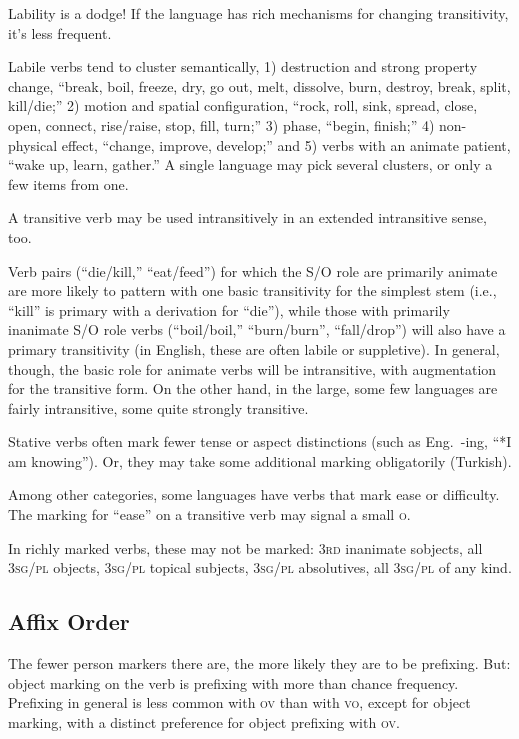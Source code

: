 \documentclass[11pt]{article}
\newcommand{\I}[1]{\textsc{#1}}   %
\begin{document}
Lability is a dodge!  If the language has rich mechanisms for changing
transitivity, it's less frequent.

Labile verbs tend to cluster semantically, 1) destruction and strong
property change, ``break, boil, freeze, dry, go out, melt, dissolve,
burn, destroy, break, split, kill/die;'' 2) motion and spatial
configuration, ``rock, roll, sink, spread, close, open, connect,
rise/raise, stop, fill, turn;'' 3) phase, ``begin, finish;'' 4)
non-physical effect, ``change, improve, develop;'' and 5) verbs with
an animate patient, ``wake up, learn, gather.''  A single language may
pick several clusters, or only a few items from one.

A transitive verb may be used intransitively in an extended
intransitive sense, too.

Verb pairs (``die/kill,'' ``eat/feed'') for which the S/O role are
primarily animate are more likely to pattern with one basic
transitivity for the simplest stem (i.e., ``kill'' is primary with a
derivation for ``die''), while those with primarily inanimate S/O role
verbs (``boil/boil,'' ``burn/burn'', ``fall/drop'') will also have a
primary transitivity (in English, these are often labile or
suppletive).  In general, though, the basic role for animate verbs
will be intransitive, with augmentation for the transitive form.  On
the other hand, in the large, some few languages are fairly
intransitive, some quite strongly transitive.

Stative verbs often mark fewer tense or aspect distinctions (such as
Eng.\ -ing, ``*I am knowing''). Or, they may take some additional
marking obligatorily (Turkish).

Among other categories, some languages have verbs that mark ease or
difficulty.  The marking for ``ease'' on a transitive verb may signal
a small \I{o}.

In richly marked verbs, these may not be marked: \I{3rd} inanimate
sobjects, all \I{3sg/pl} objects, \I{3sg/pl} topical subjects,
\I{3sg/pl} absolutives, all \I{3sg/pl} of any kind.


\subsection{Affix Order}
The fewer person markers there are, the more likely they are to be
prefixing.  But: object marking on the verb is prefixing with more
than chance frequency.  Prefixing in general is less common with
\I{ov} than with \I{vo}, except for object marking, with a distinct
preference for object prefixing with \I{ov}.
\end{document}
